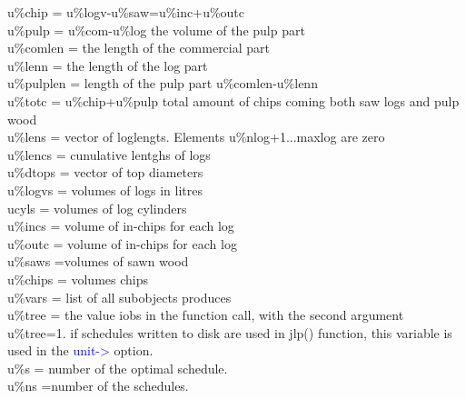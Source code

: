 u\%chip = u\%logv-u\%saw=u\%inc+u\%outc\\ 
u\%pulp = u\%com-u\%log  the volume of the pulp part\\ 
u\%comlen = the length of the commercial part\\ 
u\%lenn = the length of the log part\\ 
u\%pulplen = length of the pulp part u\%comlen-u\%lenn\\ 
u\%totc = u\%chip+u\%pulp total amount of chips coming both saw logs and pulp wood\\ 
u\%lens = vector of loglengts. Elements u\%nlog+1...maxlog are zero\\ 
u\%lencs = cunulative lentghs of logs\\ 
u\%dtops = vector of top diameters\\ 
u\%logvs = volumes of logs in litres\\ 
ucyls = volumes of log cylinders\\ 
u\%incs = volume of in-chips for each log\\ 
u\%outc = volume of in-chips for each log\\ 
u\%saws =volumes of sawn wood\\ 
u\%chips = volumes chips\\ 
u\%vars  = list of all subobjects produces\\ 
u\%tree = the value iobs in the function call, with the second argument u\%tree=1. 
if schedules written to disk are used in \textcolor{VioletRed}{jlp}() function, this variable is used in the 
\textcolor{blue}{unit->} option.\\ 
u\%s = number of the optimal schedule. \\ 
u\%ns =number of the schedules. 
\singlespacing 
